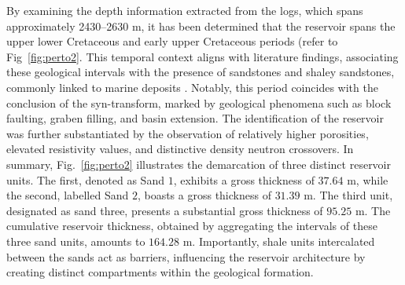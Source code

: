 \documentclass{gji}
\begin{document}
By examining the depth information extracted from the logs, which spans approximately 2430--2630 m, it has been determined that the reservoir spans the upper lower Cretaceous and early upper Cretaceous periods (refer to Fig~\ref{fig:perto2}.
This temporal context aligns with literature findings, associating these geological intervals with the presence of sandstones and shaley sandstones, commonly linked to marine deposits \citep{brownfield2006geology}.
Notably, this period coincides with the conclusion of the syn-transform, marked by geological phenomena such as block faulting, graben filling, and basin extension.
The identification of the reservoir was further substantiated by the observation of relatively higher porosities, elevated resistivity values, and distinctive density neutron crossovers.
In summary, Fig.~\ref{fig:perto2} illustrates the demarcation of three distinct reservoir units.
The first, denoted as Sand $1$, exhibits a gross thickness of $37.64$ m, while the second, labelled Sand $2$, boasts a gross thickness of $31.39$ m. 
The third unit, designated as sand three, presents a substantial gross thickness of $95.25$ m.
The cumulative reservoir thickness, obtained by aggregating the intervals of these three sand units, amounts to $164.28$ m.
Importantly, shale units intercalated between the sands act as barriers, influencing the reservoir architecture by creating distinct compartments within the geological formation.
\end{document}
